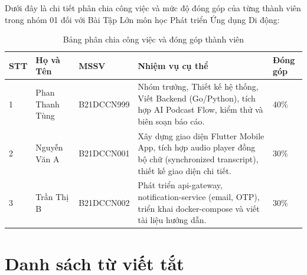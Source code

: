 \documentclass[12pt,a4paper]{report}
\begin{document}
Dưới đây là chi tiết phân chia công việc và mức độ đóng góp của từng thành viên trong nhóm 01 đối với Bài Tập Lớn môn học Phát triển Ứng dụng Di động:

\vspace{1cm}
\begin{table}[h!]
\centering
\begin{tabular}{lp{3.2cm}lp{7.5cm}l}
\toprule
\textbf{STT} & \textbf{Họ và Tên} & \textbf{MSSV} & \textbf{Nhiệm vụ cụ thể} & \textbf{Đóng góp} \\
\midrule
1 & Phan Thanh Tùng & B21DCCN999 & Nhóm trưởng, Thiết kế hệ thống, Viết Backend (Go/Python), tích hợp AI Podcast Flow, kiểm thử và biên soạn báo cáo. & 40\% \\
\midrule
2 & Nguyễn Văn A & B21DCCN001 & Xây dựng giao diện Flutter Mobile App, tích hợp audio player đồng bộ chữ (synchronized transcript), thiết kế giao diện chi tiết. & 30\% \\
\midrule
3 & Trần Thị B & B21DCCN002 & Phát triển api-gateway, notification-service (email, OTP), triển khai docker-compose và viết tài liệu hướng dẫn. & 30\% \\
\bottomrule
\end{tabular}
\caption{Bảng phân chia công việc và đóng góp thành viên}
\label{tab:contributions}
\end{table}

\newpage

\tableofcontents
\newpage
\listoftables
\newpage
\listoffigures
\newpage

\chapter*{Danh sách từ viết tắt}
\end{document}
